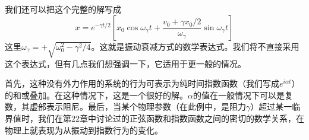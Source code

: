 我们还可以把这个完整的解写成
\begin{equation}
    \label{Eq:I:24:22}
    x=e^{-\gamma t/2}\left [ x_0\cos\omega_\gamma t + \frac{v_0+\gamma x_0/2}{\omega_\gamma}\sin\omega_\gamma t \right ]
\end{equation}
这里$\omega_\gamma=+\sqrt{\omega_0^2-\gamma^2/4}$。这就是振动衰减方式的数学表达式。我们将不直接采用这个表达式，但有几点我们想强调一下，它适用于更一般的情况。

首先，这种没有外力作用的系统的行为可表示为纯时间指数函数（我们写成$e^{i\alpha t}$）的和或叠加。在这种情况下，这是一个很好的解。$\alpha$的值在一般情况下可以是复数，其虚部表示阻尼。最后，当某个物理参数（在此例中，是阻力$\gamma$）超过某一临界值时，我们在第22章中讨论过的正弦函数和指数函数之间的密切的数学关系，在物理上就表现为从振动到指数行为的变化。